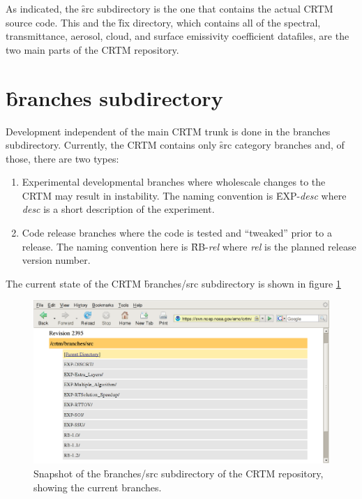As indicated, the \f{src} subdirectory is the one that contains the actual CRTM source code. This and the \f{fix}
directory, which contains all of the spectral, transmittance, aerosol, cloud, and surface emissivity coefficient datafiles, are the two main parts of the CRTM repository.


\section{\f{branches} subdirectory}
Development independent of the main CRTM trunk is done in the branches subdirectory. Currently, the CRTM contains only \f{src} category branches and, of those, there are two types:
\begin{enumerate}
  \item Experimental developmental branches where wholescale changes to the CRTM may result in instability. The naming convention is \f{EXP-}\textit{desc} where \textit{desc} is a short description of the experiment.
  \item Code release branches where the code is tested and ``tweaked'' prior to a release. The naming convention here is \f{RB-}\textit{rel} where \textit{rel} is the planned release version number.
\end{enumerate}
The current state of the CRTM \f{branches/src} subdirectory is shown in figure \ref{fig:branches_src_repository}
\begin{figure}[htb]
  \centering
  \includegraphics[scale=0.5]{graphics/branches_src_repository.eps}
  \caption{Snapshot of the \f{branches/src} subdirectory of the CRTM repository, showing the current branches.}
  \label{fig:branches_src_repository}
\end{figure}

